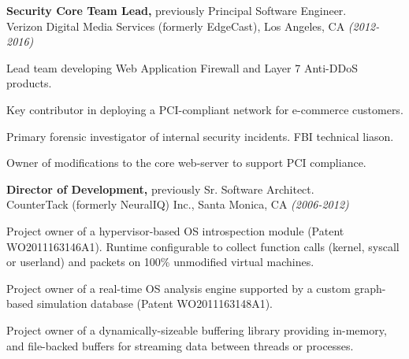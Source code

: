 \documentclass[margin]{res}
\begin{document}
\begin{resume}
{\bf Security Core Team Lead,} previously Principal Software Engineer.\\
Verizon Digital Media Services (formerly EdgeCast), Los Angeles, CA {\em (2012-2016)}
\begin{list}{}{\leftmargin=1.5em \topsep=5pt \partopsep=0pt \parsep=2.5pt}
  \item Lead team developing Web Application Firewall and Layer 7
    Anti-DDoS products.
  \item Key contributor in deploying a PCI-compliant network for e-commerce customers.
  \item Primary forensic investigator of internal security incidents.
    FBI technical liason.
  \item Owner of modifications to the core web-server to support PCI
    compliance.
\end{list}

{\bf Director of Development,} previously Sr. Software Architect. \\
CounterTack (formerly NeuralIQ) Inc., Santa Monica, CA {\em (2006-2012)}
\begin{list}{}{\leftmargin=1.5em \topsep=5pt \partopsep=0pt \parsep=2.5pt}
  \item Project owner of a hypervisor-based OS introspection module
    (Patent WO2011163146A1). Runtime configurable to collect function
    calls (kernel, syscall or userland) and packets on 100\%
    unmodified virtual machines.
  \item Project owner of a real-time OS analysis engine supported by a
    custom graph-based simulation database (Patent WO2011163148A1).
  \item Project owner of a dynamically-sizeable buffering library
    providing in-memory, and file-backed buffers for streaming
    data between threads or processes.
\end{list}


\end{resume}
\end{document}

